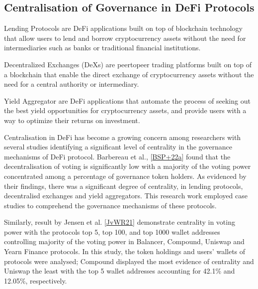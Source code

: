 \documentclass[letterpaper,10pt,english]{jupyterBook}
\begin{document}
\subsection{Centralisation of Governance in DeFi Protocols}
\label{\detokenize{GOV/gov:centralisation-of-governance-in-defi-protocols}}
\begin{sphinxShadowBox}

\sphinxAtStartPar
Lending Protocols are DeFi applications built on top of blockchain technology that allow users to lend and borrow cryptocurrency assets without the need for intermediaries such as banks or traditional financial institutions.
\end{sphinxShadowBox}

\begin{sphinxShadowBox}

\sphinxAtStartPar
Decentralized Exchanges (DeXs) are peer\sphinxhyphen{}to\sphinxhyphen{}peer trading platforms built on top of a blockchain that enable the direct exchange of cryptocurrency assets without the need for a central authority or intermediary.
\end{sphinxShadowBox}

\begin{sphinxShadowBox}

\sphinxAtStartPar
Yield Aggregator are DeFi applications that automate the process of seeking out the best yield opportunities for cryptocurrency assets, and provide users with a way to optimize their returns on investment.
\end{sphinxShadowBox}

\sphinxAtStartPar
Centralisation in DeFi has become a growing concern among researchers with several studies identifying a significant level of centrality in the governance mechanisms of DeFi protocol. Barbereau et al., {[}\hyperlink{cite.GOV/gov:id31}{BSP+22a}{]} found that the decentralisation of voting is significantly low with a majority of the voting power concentrated among a percentage of governance token holders. As evidenced by their findings, there was a significant degree of centrality, in lending protocols, decentralisd exchanges and yield aggregators. This research work employed case studies to comprehend the governance mechanisms of these protocols.

\sphinxAtStartPar
Similarly, result by Jensen et al. {[}\hyperlink{cite.GOV/gov:id30}{JvWR21}{]} demonstrate centrality in voting power with the protocols top 5, top 100, and top 1000 wallet addresses controlling majority of the voting power in Balancer, Compound, Uniswap and Yearn Finance protocols. In this study, the token holdings and users’ wallets of protocols were analysed; Compound displayed the most evidence of centrality and Uniswap the least with the top 5 wallet addresses accounting for 42.1\% and 12.05\%, respectively.
\end{document}
